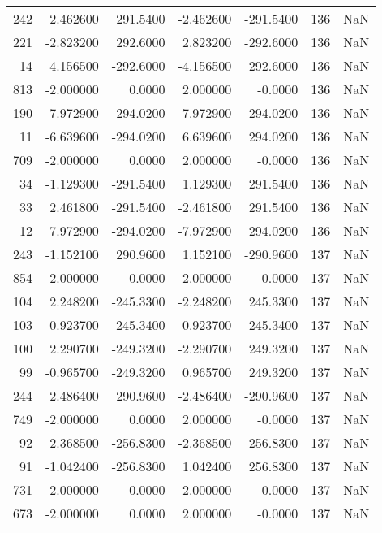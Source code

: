 \begin{tabular}{rrrrrrr}
 242 &    2.462600 &  291.5400 &   -2.462600 &   -291.5400 &         136 & NaN \\
 221 &   -2.823200 &  292.6000 &    2.823200 &   -292.6000 &         136 & NaN \\
  14 &    4.156500 & -292.6000 &   -4.156500 &    292.6000 &         136 & NaN \\
 813 &   -2.000000 &    0.0000 &    2.000000 &     -0.0000 &         136 & NaN \\
 190 &    7.972900 &  294.0200 &   -7.972900 &   -294.0200 &         136 & NaN \\
  11 &   -6.639600 & -294.0200 &    6.639600 &    294.0200 &         136 & NaN \\
 709 &   -2.000000 &    0.0000 &    2.000000 &     -0.0000 &         136 & NaN \\
  34 &   -1.129300 & -291.5400 &    1.129300 &    291.5400 &         136 & NaN \\
  33 &    2.461800 & -291.5400 &   -2.461800 &    291.5400 &         136 & NaN \\
  12 &    7.972900 & -294.0200 &   -7.972900 &    294.0200 &         136 & NaN \\
 243 &   -1.152100 &  290.9600 &    1.152100 &   -290.9600 &         137 & NaN \\
 854 &   -2.000000 &    0.0000 &    2.000000 &     -0.0000 &         137 & NaN \\
 104 &    2.248200 & -245.3300 &   -2.248200 &    245.3300 &         137 & NaN \\
 103 &   -0.923700 & -245.3400 &    0.923700 &    245.3400 &         137 & NaN \\
 100 &    2.290700 & -249.3200 &   -2.290700 &    249.3200 &         137 & NaN \\
  99 &   -0.965700 & -249.3200 &    0.965700 &    249.3200 &         137 & NaN \\
 244 &    2.486400 &  290.9600 &   -2.486400 &   -290.9600 &         137 & NaN \\
 749 &   -2.000000 &    0.0000 &    2.000000 &     -0.0000 &         137 & NaN \\
  92 &    2.368500 & -256.8300 &   -2.368500 &    256.8300 &         137 & NaN \\
  91 &   -1.042400 & -256.8300 &    1.042400 &    256.8300 &         137 & NaN \\
 731 &   -2.000000 &    0.0000 &    2.000000 &     -0.0000 &         137 & NaN \\
 673 &   -2.000000 &    0.0000 &    2.000000 &     -0.0000 &         137 & NaN \\

\end{tabular}
